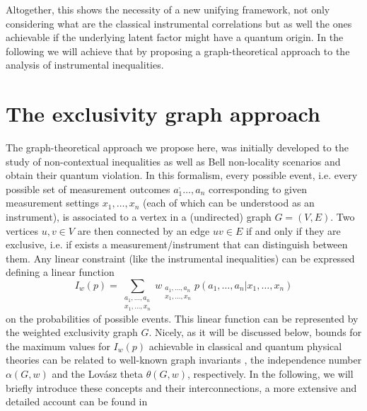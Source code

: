 \documentclass[letterpaper]{article}
\newcommand{\avg}[1]{\langle#1\rangle}
\begin{document}
Altogether, this shows the necessity of a new unifying framework, not only considering what are the classical instrumental correlations but as well the ones achievable if the underlying latent factor might have a quantum origin. In the following we will achieve that by proposing a graph-theoretical approach to the analysis of instrumental inequalities.


\section*{The exclusivity graph approach}

The graph-theoretical approach we propose here, was initially developed to the study of non-contextual inequalities \cite{cabello2014} as well as Bell non-locality scenarios \cite{acin2015} and obtain their quantum violation. In this formalism, every possible event, i.e. every possible set of measurement outcomes $a_1^,\ldots, a_n$ corresponding to given measurement settings $x_1,\ldots,x_n$ (each of which can be understood as an instrument), is associated to a vertex in a (undirected) graph $G = (V, E)$. Two vertices $u, v \in V$ are then connected by an edge $uv \in E$ if and only if they are exclusive, i.e.  if exists a measurement/instrument that can distinguish between them. Any linear constraint (like the instrumental inequalities) can be expressed defining a linear function 
\begin{equation}
    I_w(p) = \sum_{\substack{a_1,\ldots,a_n\\x_1,\ldots,x_n}}
w_{\substack{a_1,\ldots,a_n\\x_1,\ldots,x_n}} p(a_1,\ldots,a_n|x_1,\ldots,x_n)
\end{equation}
on the probabilities of possible events. This linear function can be represented by the weighted exclusivity graph $G$. Nicely, as it will be discussed below, bounds for the maximum values for $ I_w(p)$ achievable in classical and quantum physical theories can be related to well-known graph invariants \cite{}, the independence number $\alpha(G, w)$ and the Lovász theta $\theta(G, w)$, respectively. In the following, we will briefly introduce these concepts and their interconnections, a more extensive and detailed account can be found in \cite{cabello2014, rabelo2014,acin2015}
\end{document}
